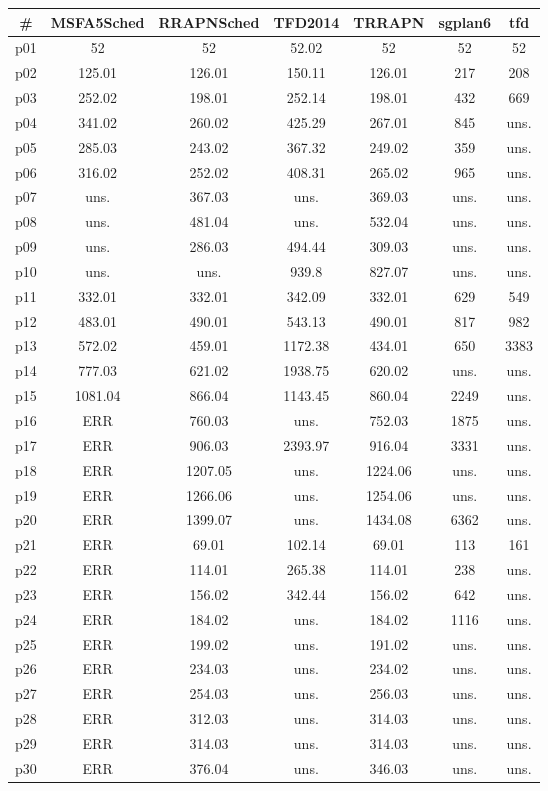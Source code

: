 \begin{tabular}{ccccccc}
\toprule
\textbf{\#} & \textbf{MSFA5Sched} & \textbf{RRAPNSched} & \textbf{TFD2014} & \textbf{TRRAPN} & \textbf{sgplan6} & \textbf{tfd}\\
\midrule
p01 & 52 & 52 & 52.02 & 52 & 52 & 52\\
p02 & 125.01 & 126.01 & 150.11 & 126.01 & 217 & 208\\
p03 & 252.02 & 198.01 & 252.14 & 198.01 & 432 & 669\\
p04 & 341.02 & 260.02 & 425.29 & 267.01 & 845 & uns.\\
p05 & 285.03 & 243.02 & 367.32 & 249.02 & 359 & uns.\\
p06 & 316.02 & 252.02 & 408.31 & 265.02 & 965 & uns.\\
p07 & uns. & 367.03 & uns. & 369.03 & uns. & uns.\\
p08 & uns. & 481.04 & uns. & 532.04 & uns. & uns.\\
p09 & uns. & 286.03 & 494.44 & 309.03 & uns. & uns.\\
p10 & uns. & uns. & 939.8 & 827.07 & uns. & uns.\\
p11 & 332.01 & 332.01 & 342.09 & 332.01 & 629 & 549\\
p12 & 483.01 & 490.01 & 543.13 & 490.01 & 817 & 982\\
p13 & 572.02 & 459.01 & 1172.38 & 434.01 & 650 & 3383\\
p14 & 777.03 & 621.02 & 1938.75 & 620.02 & uns. & uns.\\
p15 & 1081.04 & 866.04 & 1143.45 & 860.04 & 2249 & uns.\\
p16 & ERR & 760.03 & uns. & 752.03 & 1875 & uns.\\
p17 & ERR & 906.03 & 2393.97 & 916.04 & 3331 & uns.\\
p18 & ERR & 1207.05 & uns. & 1224.06 & uns. & uns.\\
p19 & ERR & 1266.06 & uns. & 1254.06 & uns. & uns.\\
p20 & ERR & 1399.07 & uns. & 1434.08 & 6362 & uns.\\
p21 & ERR & 69.01 & 102.14 & 69.01 & 113 & 161\\
p22 & ERR & 114.01 & 265.38 & 114.01 & 238 & uns.\\
p23 & ERR & 156.02 & 342.44 & 156.02 & 642 & uns.\\
p24 & ERR & 184.02 & uns. & 184.02 & 1116 & uns.\\
p25 & ERR & 199.02 & uns. & 191.02 & uns. & uns.\\
p26 & ERR & 234.03 & uns. & 234.02 & uns. & uns.\\
p27 & ERR & 254.03 & uns. & 256.03 & uns. & uns.\\
p28 & ERR & 312.03 & uns. & 314.03 & uns. & uns.\\
p29 & ERR & 314.03 & uns. & 314.03 & uns. & uns.\\
p30 & ERR & 376.04 & uns. & 346.03 & uns. & uns.\\
\bottomrule
\end{tabular}

